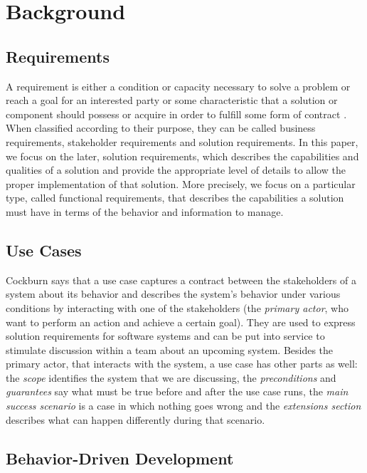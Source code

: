 \section{Background}

\subsection{Requirements}

A requirement is either a condition or capacity necessary to solve a problem or reach a goal for an interested party or some characteristic that a solution or component should possess or acquire in order to fulfill some form of contract \cite{Babok_2009}. When classified according to their purpose, they can be called business requirements, stakeholder requirements and solution requirements. In this paper, we focus on the later, solution requirements, which describes the capabilities and qualities of a solution and provide the appropriate level of details to allow the proper implementation of that solution. More precisely, we focus on a particular type, called functional requirements, that describes the capabilities a solution must have in terms of the behavior and information to manage. 

\subsection{Use Cases}

Cockburn \cite{Cockburn_2000} says that a use case captures a contract between the stakeholders of a system about its behavior and describes the system’s behavior under various conditions by interacting with one of the stakeholders (the \textit{primary actor}, who want to perform an action and achieve a certain goal). They are used to express solution requirements for software systems and can be put into service to stimulate discussion within a team about an upcoming system. Besides the primary actor, that interacts with the system, a use case has other parts as well: the \textit{scope} identifies the system that we are discussing, the \textit{preconditions} and \textit{guarantees} say what must be true before and after the use case runs, the \textit{main success scenario} is a case in which nothing goes wrong and the \textit{extensions section} describes what can happen differently during that scenario.

\subsection{Behavior-Driven Development}

